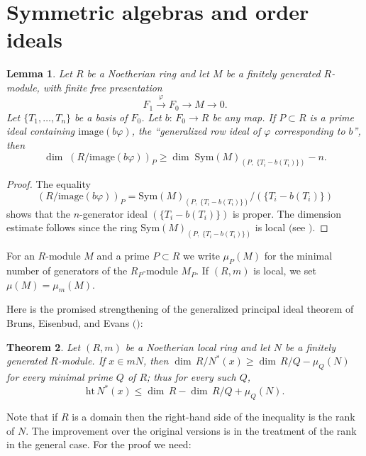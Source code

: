 \documentclass{proc-l}
\newcommand{\hgt}{\mathrm{ht}}
\newcommand{\Sym}{\mathrm{ Sym}}
\newcommand{\image}{\mathrm{ image}}
\newtheorem{Theorem}{Theorem}[section]
\newtheorem{Lemma}[Theorem]{Lemma}
\theoremstyle{remark}
\theoremstyle{definition}
\begin{document}
\section{Symmetric algebras and order ideals}


\begin{Lemma}\label{Lemma1.1}  
Let $R$ be a Noetherian ring and let
$M$ be a finitely generated $R$-module, with finite free presentation
\begin{equation*}
 F_1 \stackrel{\varphi}{\longrightarrow} F_0 \longrightarrow M \rightarrow 0.
\end{equation*}
Let $\{T_1, \dots, T_n\}$ be a basis of $F_0$. Let $b\!:\, F_0 \longrightarrow R$
be any map.  If $P\subset R$ is a prime ideal containing
$\image(b\varphi)$, the ``generalized row ideal of $\varphi$ corresponding to
$b$'',
then
\begin{equation*} \dim \; (R/\image(b\varphi))_P \geq
 \dim \; \Sym(M)_{(P,\; \{T_i-b(T_i)\})} -n .
\end{equation*}
\end{Lemma}
\begin{proof}
The equality
\begin{equation*} (R/\image(b\varphi))_P = \Sym(M)_{(P,\;
\{T_i-b(T_i)\})}/(\{T_i-b(T_i)\})
\end{equation*}
shows that the $n$-generator ideal 
$(\{T_i-b(T_i)\})$ is proper.
The dimension estimate follows since the ring
$\Sym(M)_{(P,\; \{T_i-b(T_i)\})}$ is local $($see
\cite[Corollary~10.9]{E}$)$.
\end{proof}


For an $R$-module $M$ and a prime $P\subset R$ we write $\mu_P(M)$ for
the minimal number of generators of the
$R_P$-module $M_P$. If $(R,m)$ is local, we set $\mu(M)=\mu_m(M)$.

Here is the promised strengthening of the generalized principal
ideal theorem of Bruns, Eisenbud, and Evans $($\cite[Theorem~1]{B}$)$:

\begin{Theorem}\label{Theorem1.2}  
Let $(R,m)$ be a Noetherian local ring and let
$N$ be a finitely generated $R$-module. If $x\in mN$, then
$\dim \, R/N^*(x) \geq \dim \, R/Q-\mu_Q(N)$ for every minimal prime $Q$
of
$R$; thus for every such $Q$,
\begin{equation*} 
\hgt \, N^*(x) \leq \dim \, R-\dim \, R/Q +\mu_Q(N).
\end{equation*}
\end{Theorem}

Note that if $R$ is a domain then
the right-hand side of the inequality is the rank of $N$.
The improvement over the original versions is in the treatment of
the rank in the general case.
For the proof we need:
\end{document}
